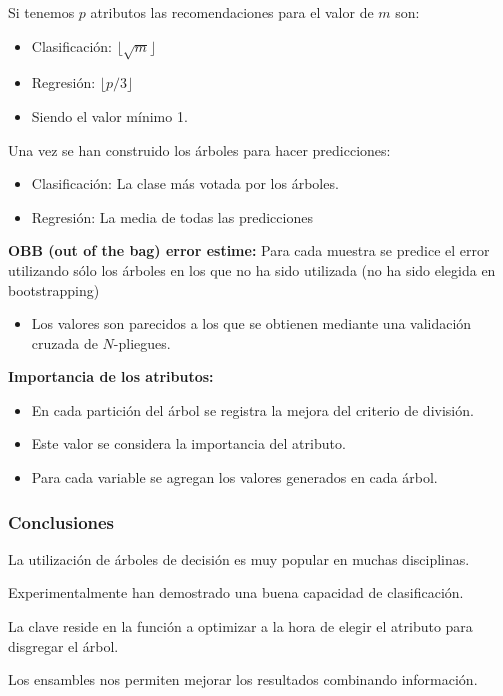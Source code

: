 Si tenemos $p$ atributos las recomendaciones para el valor de $m$ son:
\begin{itemize}
\item Clasificación: $\lfloor\sqrt{m}\rfloor$

\item Regresión: $\lfloor p/3\rfloor$
\item Siendo el valor mínimo 1.
\end{itemize}
Una vez se han construido los árboles para hacer predicciones:
\begin{itemize}
	\item Clasificación: La clase más votada por los árboles.
	\item Regresión: La media de todas las predicciones
\end{itemize}
\textbf{OBB (out of the bag) error estime:} Para cada muestra se predice el error utilizando sólo los árboles en los que no ha sido utilizada (no ha sido elegida en bootstrapping)
\begin{itemize}
	\item Los valores son parecidos a los que se obtienen mediante una validación cruzada de $N$-pliegues.
\end{itemize}
\textbf{Importancia de los atributos:}
\begin{itemize}
	\item En cada partición del árbol se registra la mejora del criterio de división.
	\item Este valor se considera la importancia del atributo.
	\item Para cada variable se agregan los valores generados en cada árbol.
\end{itemize}
\subsubsection{Conclusiones}
La utilización de árboles de decisión es muy popular en muchas disciplinas.

Experimentalmente han demostrado una buena capacidad de clasificación.

La clave reside en la función a optimizar a la hora de elegir el atributo para disgregar el árbol.

Los ensambles nos permiten mejorar los resultados combinando información.